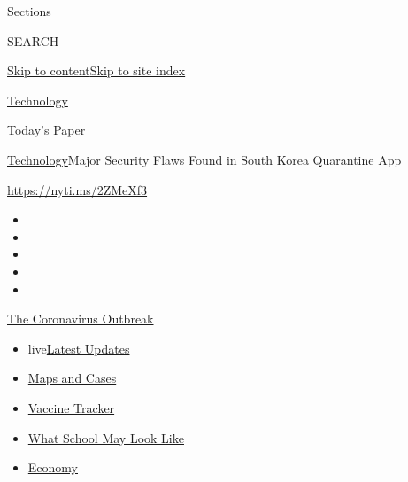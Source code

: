 Sections

SEARCH

\protect\hyperlink{site-content}{Skip to
content}\protect\hyperlink{site-index}{Skip to site index}

\href{https://www.nytimes.com/section/technology}{Technology}

\href{https://myaccount.nytimes.com/auth/login?response_type=cookie\&client_id=vi}{}

\href{https://www.nytimes.com/section/todayspaper}{Today's Paper}

\href{/section/technology}{Technology}\textbar{}Major Security Flaws
Found in South Korea Quarantine App

\url{https://nyti.ms/2ZMeXf3}

\begin{itemize}
\item
\item
\item
\item
\item
\end{itemize}

\href{https://www.nytimes.com/news-event/coronavirus?action=click\&pgtype=Article\&state=default\&region=TOP_BANNER\&context=storylines_menu}{The
Coronavirus Outbreak}

\begin{itemize}
\tightlist
\item
  live\href{https://www.nytimes.com/2020/08/01/world/coronavirus-covid-19.html?action=click\&pgtype=Article\&state=default\&region=TOP_BANNER\&context=storylines_menu}{Latest
  Updates}
\item
  \href{https://www.nytimes.com/interactive/2020/us/coronavirus-us-cases.html?action=click\&pgtype=Article\&state=default\&region=TOP_BANNER\&context=storylines_menu}{Maps
  and Cases}
\item
  \href{https://www.nytimes.com/interactive/2020/science/coronavirus-vaccine-tracker.html?action=click\&pgtype=Article\&state=default\&region=TOP_BANNER\&context=storylines_menu}{Vaccine
  Tracker}
\item
  \href{https://www.nytimes.com/interactive/2020/07/29/us/schools-reopening-coronavirus.html?action=click\&pgtype=Article\&state=default\&region=TOP_BANNER\&context=storylines_menu}{What
  School May Look Like}
\item
  \href{https://www.nytimes.com/live/2020/07/31/business/stock-market-today-coronavirus?action=click\&pgtype=Article\&state=default\&region=TOP_BANNER\&context=storylines_menu}{Economy}
\end{itemize}

